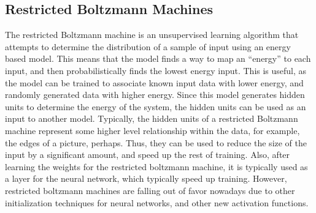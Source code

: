 \documentclass{article}
\begin{document}
\subsection{Restricted Boltzmann Machines}
The restricted Boltzmann machine is an unsupervised learning algorithm that
attempts to determine the distribution of a sample of input using an energy
based model. This means that the model finds a way to map an ``energy'' to each
input, and then probabilistically finds the lowest energy input. This is useful,
as the model can be trained to associate known input data with lower energy, and
randomly generated data with higher energy. Since this model generates hidden
units to determine the energy of the system, the hidden units can be used as an
input to another model. Typically, the hidden units of a restricted Boltzmann
machine represent some higher level relationship within the data, for example,
the edges of a picture, perhaps. Thus, they can be used to reduce the size of
the input by a significant amount, and speed up the rest of training. Also,
after learning the weights for the restricted boltzmann machine, it is typically
used as a layer for the neural network, which typically speed up training.
However, restricted boltzmann machines are falling out of favor nowadays due to
other initialization techniques for neural networks, and other new activation
functions.
\end{document}

